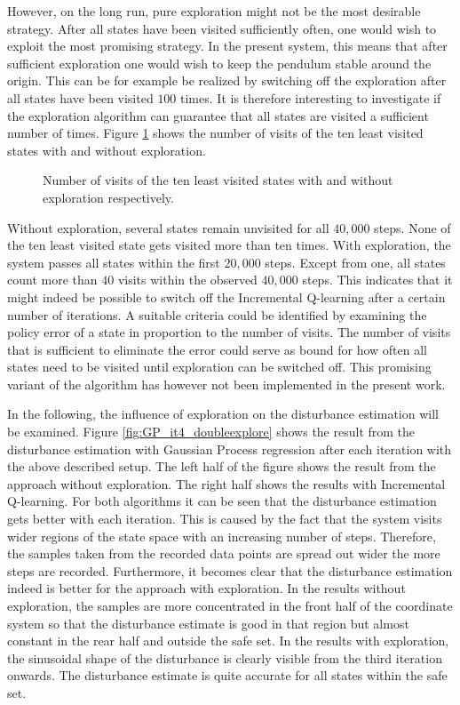 \documentclass[../main.tex]{subfiles}
\begin{document}
However, on the long run, pure exploration might not be the most desirable strategy. After all states have been visited sufficiently often, one would wish to exploit the most promising strategy. In the present system, this means that after sufficient exploration one would wish to keep the pendulum stable around the origin. This can be for example be realized by switching off the exploration after all states have been visited $100$ times. It is therefore interesting to investigate if the exploration algorithm can guarantee that all states are visited a sufficient number of times. Figure \ref{fig:leastvisited} shows the number of visits of the ten least visited states with and without exploration. 
\begin{figure}[h]
    \centering
        \caption{Number of visits of the ten least visited states with and without exploration respectively.}  \label{fig:leastvisited}
\end{figure}
Without exploration, several states remain unvisited for all $40,000$ steps. None of the ten least visited state gets visited more than ten times. With exploration, the system passes all states within the first $20,000$ steps. Except from one, all states count more than $40$ visits within the observed $40,000$ steps. This indicates that it might indeed be possible to switch off the Incremental Q-learning after a certain number of iterations. A suitable criteria could be identified by examining the policy error of a state in proportion to the number of visits. The number of visits that is sufficient to eliminate the error could serve as bound for how often all states need to be visited until exploration can be switched off. This promising variant of the algorithm has however not been implemented in the present work.\par

In the following, the influence of exploration on the disturbance estimation will be examined. Figure \ref{fig:GP_it4_doubleexplore} shows the result from the disturbance estimation with Gaussian Process regression after each iteration with the above described setup. The left half of the figure shows the result from the approach without exploration. The right half shows the results with Incremental Q-learning. For both algorithms it can be seen that the disturbance estimation gets better with each iteration. This is caused by the fact that the system visits wider regions of the state space with an increasing number of steps. Therefore, the samples taken from the recorded data points are spread out wider the more steps are recorded. Furthermore, it becomes clear that the disturbance estimation indeed is better for the approach with exploration. In the results without exploration, the samples are more concentrated in the front half of the coordinate system so that the disturbance estimate is good in that region but almost constant in the rear half and outside the safe set. In the results with exploration, the sinusoidal shape of the disturbance is clearly visible from the third iteration onwards. The disturbance estimate is quite accurate for all states within the safe set. 
\end{document}
